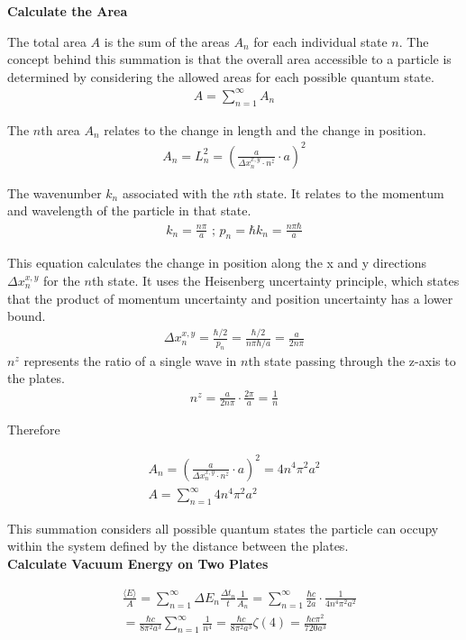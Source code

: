 \noindent\textbf{Calculate the Area}


The total area $A$ is the sum of the areas $A_n$ for each individual state $n$.
The concept behind this summation is that the overall area accessible to 
a particle is determined by considering the allowed areas for each possible quantum state.
\begin{align}
    A = \sum_{n=1}^{\infty}A_n
\end{align}

    The $n$th area $A_n$ relates to the change in length and the change in position.
    \begin{align}
        A_n = L_n^2 = (\frac{a}{\Delta x_n^{x,y} \cdot n^z} \cdot a)^2
    \end{align}

    The wavenumber $k_n$ associated with the $n$th state. It relates to the momentum and wavelength of the particle in that state.
    \begin{align}
        k_n = \frac{n \pi}{a}\text{ ;  } p_n = \hbar k_n = \frac{n \pi \hbar}{a}
    \end{align}

    This equation calculates the change in position along the x and y directions $\Delta x_n^{x,y}$ for the $n$th state. 
It uses the Heisenberg uncertainty principle, which states that the product of momentum uncertainty and position uncertainty 
has a lower bound.
    \begin{align}
        \Delta x_n^{x, y} = \frac{\hbar/2}{p_n} = \frac{\hbar/2}{n \pi \hbar/a} = \frac{a}{2 n \pi}
    \end{align}
$n^z$ represents the ratio of a single wave in $n$th state passing through the z-axis to the plates.
    \begin{align}
        n^z = \frac{a}{2 n \pi} \cdot \frac{2 \pi}{a} =\frac{1}{n}
    \end{align}
    
Therefore

    \begin{align}
        &A_n = (\frac{a}{\Delta x_n^{x,y} \cdot n^z} \cdot a)^2 = 4 n^4 \pi^2 a^2& \\
        &A = \sum_{n=1}^{\infty}4 n^4 \pi^2 a^2&
    \end{align}

This summation considers all possible quantum states the particle can occupy within the system 
defined by the distance between the plates.\\

\noindent\textbf{Calculate Vacuum Energy on Two Plates}


\begin{align}
    &\frac{\langle E \rangle}{A} = \sum_{n=1}^{\infty}\Delta E_n\frac{\Delta t_n}{t}\frac{1}{A_n} = \sum_{n=1}^{\infty} \frac{\hbar c }{2 a} \cdot \frac{1}{4 n^4 \pi^2 a^2} \nonumber \\
    &= \frac{\hbar c}{8 \pi^2 a^3} \sum_{n=1}^{\infty} \frac{1}{n^4} = \frac{\hbar c}{8 \pi^2 a^3} \zeta(4) = \frac{\hbar c \pi^2}{720 a^3}
\end{align}
